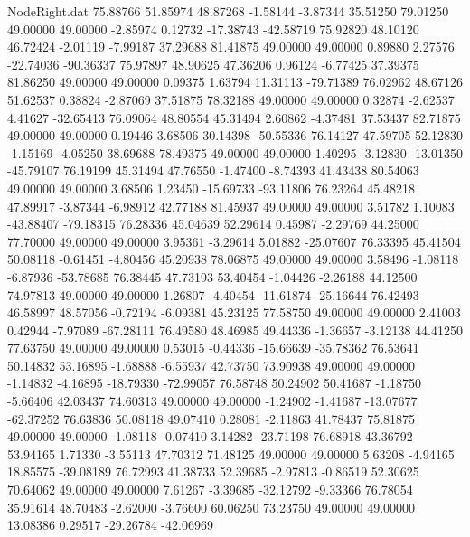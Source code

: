 \begin{filecontents}{NodeRight.dat}
  75.88766   51.85974   48.87268    -1.58144   -3.87344   35.51250   79.01250   49.00000   49.00000   -2.85974    0.12732  -17.38743  -42.58719
  75.92820   48.10120   46.72424    -2.01119   -7.99187   37.29688   81.41875   49.00000   49.00000    0.89880    2.27576  -22.74036  -90.36337
  75.97897   48.90625   47.36206     0.96124   -6.77425   37.39375   81.86250   49.00000   49.00000    0.09375    1.63794   11.31113  -79.71389
  76.02962   48.67126   51.62537     0.38824   -2.87069   37.51875   78.32188   49.00000   49.00000    0.32874   -2.62537    4.41627  -32.65413
  76.09064   48.80554   45.31494     2.60862   -4.37481   37.53437   82.71875   49.00000   49.00000    0.19446    3.68506   30.14398  -50.55336
  76.14127   47.59705   52.12830    -1.15169   -4.05250   38.69688   78.49375   49.00000   49.00000    1.40295   -3.12830  -13.01350  -45.79107
  76.19199   45.31494   47.76550    -1.47400   -8.74393   41.43438   80.54063   49.00000   49.00000    3.68506    1.23450  -15.69733  -93.11806
  76.23264   45.48218   47.89917    -3.87344   -6.98912   42.77188   81.45937   49.00000   49.00000    3.51782    1.10083  -43.88407  -79.18315
  76.28336   45.04639   52.29614     0.45987   -2.29769   44.25000   77.70000   49.00000   49.00000    3.95361   -3.29614    5.01882  -25.07607
  76.33395   45.41504   50.08118    -0.61451   -4.80456   45.20938   78.06875   49.00000   49.00000    3.58496   -1.08118   -6.87936  -53.78685
  76.38445   47.73193   53.40454    -1.04426   -2.26188   44.12500   74.97813   49.00000   49.00000    1.26807   -4.40454  -11.61874  -25.16644
  76.42493   46.58997   48.57056    -0.72194   -6.09381   45.23125   77.58750   49.00000   49.00000    2.41003    0.42944   -7.97089  -67.28111
  76.49580   48.46985   49.44336    -1.36657   -3.12138   44.41250   77.63750   49.00000   49.00000    0.53015   -0.44336  -15.66639  -35.78362
  76.53641   50.14832   53.16895    -1.68888   -6.55937   42.73750   73.90938   49.00000   49.00000   -1.14832   -4.16895  -18.79330  -72.99057
  76.58748   50.24902   50.41687    -1.18750   -5.66406   42.03437   74.60313   49.00000   49.00000   -1.24902   -1.41687  -13.07677  -62.37252
  76.63836   50.08118   49.07410     0.28081   -2.11863   41.78437   75.81875   49.00000   49.00000   -1.08118   -0.07410    3.14282  -23.71198
  76.68918   43.36792   53.94165     1.71330   -3.55113   47.70312   71.48125   49.00000   49.00000    5.63208   -4.94165   18.85575  -39.08189
  76.72993   41.38733   52.39685    -2.97813   -0.86519   52.30625   70.64062   49.00000   49.00000    7.61267   -3.39685  -32.12792   -9.33366
  76.78054   35.91614   48.70483    -2.62000   -3.76600   60.06250   73.23750   49.00000   49.00000   13.08386    0.29517  -29.26784  -42.06969

\end{filecontents}
